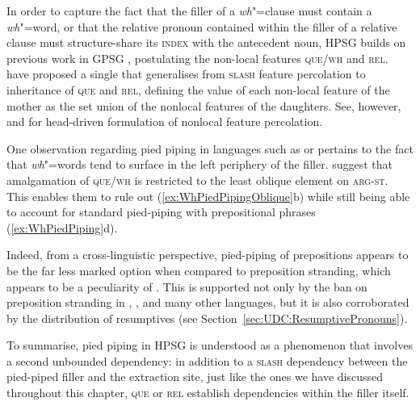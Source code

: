 \documentclass[output=paper
,notxmath 
 	        ,biblatex
                ,babelshorthands
                ,newtxmath
                ,draftmode
                ,colorlinks, citecolor=brown
]{langscibook}
\begin{document}
\noindent
In order to capture the fact that the filler of a \emph{wh}"=clause
must contain a \emph{wh}"=word, or that the relative pronoun contained
within the filler of a relative clause must structure-share its
\textsc{index} with the antecedent noun, HPSG builds on previous work
in GPSG \citep[Chapter~5.2]{Gazdar85}, postulating the non-local features
\textsc{que}/\textsc{wh} and \textsc{rel}. \citet[]{Pollard:Sag:94} have proposed
a single  that generalises from
\textsc{slash} feature percolation to inheritance of \textsc{que} and
\textsc{rel}, defining the value of each non-local feature of the
mother as the set union of the nonlocal features of the
daughters. See, however, \citet[Section~4.2]{Sag:97} and
\citet[Chapter~7]{Ginzburg:Sag:01}\addpages
for head-driven formulation of nonlocal feature percolation.

One observation regarding pied piping in languages such as  or
 pertains to the fact that \emph{wh}"=words tend to surface in
the left periphery of the filler. \citet[194,~fn.~26]{Ginzburg:Sag:01} suggest that
amalgamation of \textsc{que/wh} is restricted to the least oblique
element on \textsc{arg-st}. This enables them to rule out
(\ref{ex:WhPiedPipingOblique}b) while still being able to account for
standard pied-piping with prepositional phrases
(\ref{ex:WhPiedPiping}d).

\begin{exe}
  \ex \label{ex:WhPiedPipingOblique}
  \begin{xlist}
  \end{xlist}
\end{exe}

\noindent
Indeed, from a cross-linguistic perspective, pied-piping of
prepositions appears to be the far less marked option when compared to
preposition stranding, which appears to be a peculiarity of
. This is supported not only by the ban on preposition
stranding in , , and many other languages, but it is also
corroborated by the distribution of resumptives (see Section~\ref{sec:UDC:ResumptivePronouns}).

To summarise, pied piping in HPSG is understood as a phenomenon that
involves a second unbounded dependency: in addition to a
\textsc{slash} dependency between the pied-piped filler and the
extraction site, just like the ones we have discussed throughout this
chapter, \textsc{que} or \textsc{rel} establish dependencies within
the filler itself.
\end{document}
